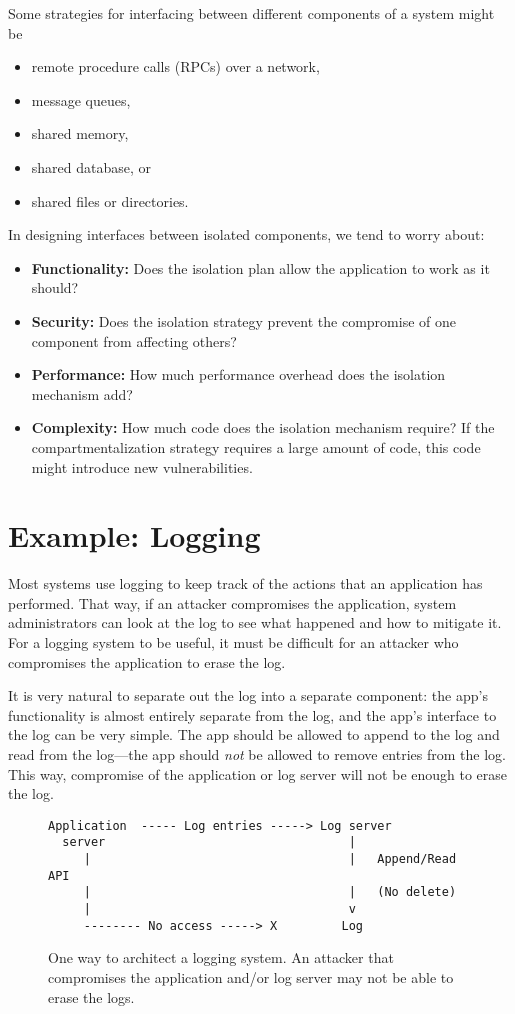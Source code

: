 Some strategies for interfacing between different components
of a system might be
\begin{itemize}
\item remote procedure calls (RPCs) over a network,
\item message queues,
\item shared memory,
\item shared database, or
\item shared files or directories.
\end{itemize}

In designing interfaces between isolated components,
we tend to worry about:
\begin{itemize}
  \item \textbf{Functionality:} Does the isolation plan allow the application to work as it should?
  \item \textbf{Security:} Does the isolation strategy prevent the compromise of one component from affecting others?
  \item \textbf{Performance:} How much performance overhead does the isolation mechanism add?
  \item \textbf{Complexity:} How much code does the isolation mechanism require?
If the compartmentalization strategy requires a large
amount of code, this code might introduce new vulnerabilities.
    
\end{itemize}

\section{Example: Logging}
Most systems use logging to keep track of the actions that an application has performed.
That way, if an attacker compromises the application, system administrators can 
look at the log to see what happened and how to mitigate it.
For a logging system to be useful, it must be difficult for an attacker who compromises
the application to erase the log.

It is very natural to separate out the log into a separate component:
the app's functionality is almost entirely
separate from the log, and the app's interface to
the log can be very simple.
The app should be allowed to append to the log and
read from the log---the app should 
\emph{not} be allowed to remove entries from the
log. This way, compromise of the application or log server
will not be enough to erase the log.
\begin{figure}
\begin{verbatim}
Application  ----- Log entries -----> Log server
  server                                  |
     |                                    |   Append/Read API
     |                                    |   (No delete)
     |                                    v
     -------- No access -----> X         Log
\end{verbatim}
\caption{One way to architect a logging system.
  An attacker that compromises the application and/or log
  server may not be able to erase the logs.}
\end{figure}

